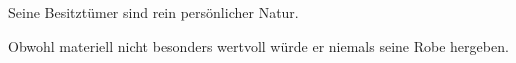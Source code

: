 
Seine Besitztümer sind rein persönlicher Natur.

Obwohl materiell nicht besonders wertvoll würde er niemals seine Robe hergeben.

